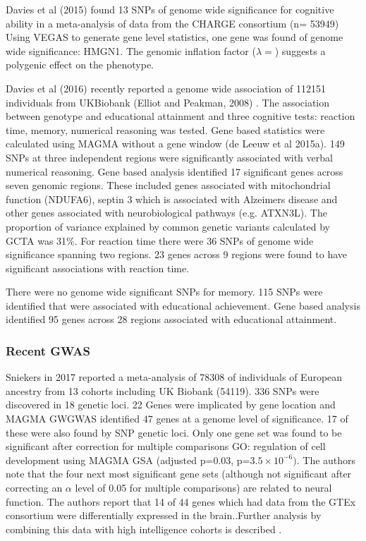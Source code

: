 Davies et al (2015)\cite{davies2015genetic} found 13 SNPs of genome wide significance for cognitive ability in a meta-analysis of data from the CHARGE consortium (n= 53949) Using VEGAS to generate gene level statistics, one gene was found of genome wide significance: HMGN1. The genomic inflation factor ($\lambda=$) suggests a polygenic effect on the phenotype.

Davies et al (2016)\cite{davies2015genetic} recently reported a genome wide association of 112151 individuals from UKBiobank (Elliot and Peakman, 2008)\cite{bycroft2018uk} \cite{elliott2008uk}. The association between genotype and educational attainment and three cognitive tests: reaction time, memory, numerical reasoning was tested. Gene based statistics were calculated using MAGMA without a gene window \cite{de2015magma}(de Leeuw et al 2015a). 149 SNPs at three independent regions were significantly associated with verbal numerical reasoning. Gene based analysis identified 17 significant genes across seven genomic regions. These included genes associated with mitochondrial function (NDUFA6), septin 3 which is associated with Alzeimers disease and other genes associated with neurobiological pathways (e.g. ATXN3L). The proportion of variance explained by common genetic variants calculated by GCTA was 31\%.
For reaction time there were 36 SNPs of genome wide significance spanning two regions. 23 genes across 9 regions were found to have significant associations with reaction time. 

There were no genome wide significant SNPs for memory. 115 SNPs were identified that were associated with educational achievement. Gene based analysis identified 95 genes across 28 regions associated with educational attainment.

\subsubsection{Recent GWAS}
Sniekers \cite{sniekers2017genome} in 2017 reported a meta-analysis of 78308 of  individuals of European ancestry from 13 cohorts including UK Biobank (54119). 336 SNPs were discovered in 18 genetic loci. 22 Genes were implicated by gene location and MAGMA GWGWAS identified 47 genes at a genome level of significance. 17 of these were also found by SNP genetic loci. Only one gene set was found to be significant after correction for multiple comparisons GO: regulation of cell development using MAGMA GSA (adjusted p=0.03, p=$3.5 \times 10^{-6})$.\cite{de2015magma} The authors note that the four next most significant gene sets (although not significant after correcting an $\alpha$ level of 0.05 for multiple comparisons) are related to neural function. The authors report that 14 of 44 genes which had data from the GTEx consortium were differentially expressed in the brain.\cite{gtex2015genotype}.Further analysis by combining this data with high intelligence cohorts is described \cite{coleman2019biological}.

